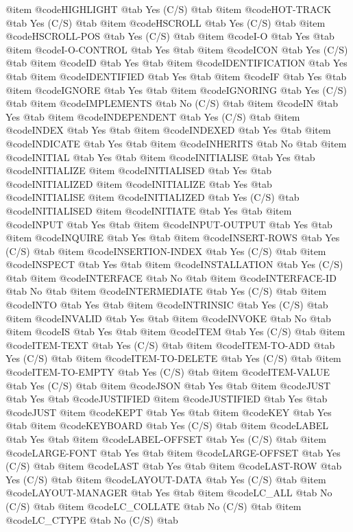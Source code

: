 @item @code{HIGHLIGHT} @tab Yes	(C/S) @tab 
@item @code{HOT-TRACK} @tab Yes	(C/S) @tab 
@item @code{HSCROLL} @tab Yes	(C/S) @tab 
@item @code{HSCROLL-POS} @tab Yes	(C/S) @tab 
@item @code{I-O} @tab Yes @tab 
@item @code{I-O-CONTROL} @tab Yes @tab 
@item @code{ICON} @tab Yes	(C/S) @tab 
@item @code{ID} @tab Yes @tab 
@item @code{IDENTIFICATION} @tab Yes @tab 
@item @code{IDENTIFIED} @tab Yes @tab 
@item @code{IF} @tab Yes @tab 
@item @code{IGNORE} @tab Yes @tab 
@item @code{IGNORING} @tab Yes	(C/S) @tab 
@item @code{IMPLEMENTS} @tab No	(C/S) @tab 
@item @code{IN} @tab Yes @tab 
@item @code{INDEPENDENT} @tab Yes	(C/S) @tab 
@item @code{INDEX} @tab Yes @tab 
@item @code{INDEXED} @tab Yes @tab 
@item @code{INDICATE} @tab Yes @tab 
@item @code{INHERITS} @tab No @tab 
@item @code{INITIAL} @tab Yes @tab 
@item @code{INITIALISE} @tab Yes @tab @code{INITIALIZE}
@item @code{INITIALISED} @tab Yes @tab @code{INITIALIZED}
@item @code{INITIALIZE} @tab Yes @tab @code{INITIALISE}
@item @code{INITIALIZED} @tab Yes	(C/S) @tab @code{INITIALISED}
@item @code{INITIATE} @tab Yes @tab 
@item @code{INPUT} @tab Yes @tab 
@item @code{INPUT-OUTPUT} @tab Yes @tab 
@item @code{INQUIRE} @tab Yes @tab 
@item @code{INSERT-ROWS} @tab Yes	(C/S) @tab 
@item @code{INSERTION-INDEX} @tab Yes	(C/S) @tab 
@item @code{INSPECT} @tab Yes @tab 
@item @code{INSTALLATION} @tab Yes	(C/S) @tab 
@item @code{INTERFACE} @tab No @tab 
@item @code{INTERFACE-ID} @tab No @tab 
@item @code{INTERMEDIATE} @tab Yes	(C/S) @tab 
@item @code{INTO} @tab Yes @tab 
@item @code{INTRINSIC} @tab Yes	(C/S) @tab 
@item @code{INVALID} @tab Yes @tab 
@item @code{INVOKE} @tab No @tab 
@item @code{IS} @tab Yes @tab 
@item @code{ITEM} @tab Yes	(C/S) @tab 
@item @code{ITEM-TEXT} @tab Yes	(C/S) @tab 
@item @code{ITEM-TO-ADD} @tab Yes	(C/S) @tab 
@item @code{ITEM-TO-DELETE} @tab Yes	(C/S) @tab 
@item @code{ITEM-TO-EMPTY} @tab Yes	(C/S) @tab 
@item @code{ITEM-VALUE} @tab Yes	(C/S) @tab 
@item @code{JSON} @tab Yes @tab 
@item @code{JUST} @tab Yes @tab @code{JUSTIFIED}
@item @code{JUSTIFIED} @tab Yes @tab @code{JUST}
@item @code{KEPT} @tab Yes @tab 
@item @code{KEY} @tab Yes @tab 
@item @code{KEYBOARD} @tab Yes	(C/S) @tab 
@item @code{LABEL} @tab Yes @tab 
@item @code{LABEL-OFFSET} @tab Yes	(C/S) @tab 
@item @code{LARGE-FONT} @tab Yes @tab 
@item @code{LARGE-OFFSET} @tab Yes	(C/S) @tab 
@item @code{LAST} @tab Yes @tab 
@item @code{LAST-ROW} @tab Yes	(C/S) @tab 
@item @code{LAYOUT-DATA} @tab Yes	(C/S) @tab 
@item @code{LAYOUT-MANAGER} @tab Yes @tab 
@item @code{LC_ALL} @tab No	(C/S) @tab 
@item @code{LC_COLLATE} @tab No	(C/S) @tab 
@item @code{LC_CTYPE} @tab No	(C/S) @tab 
